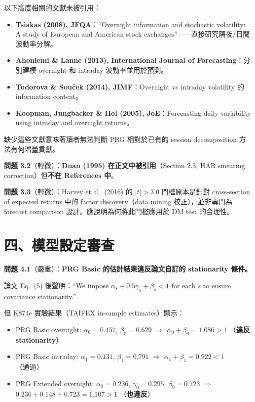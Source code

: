 \documentclass[12pt,a4paper]{article}
\begin{document}
以下高度相關的文獻未被引用：
\begin{itemize}
    \item \textbf{Tsiakas (2008), JFQA}：``Overnight information and stochastic volatility: A study of European and American stock exchanges''——直接研究隔夜/日間波動率分解。
    \item \textbf{Ahoniemi \& Lanne (2013), International Journal of Forecasting}：分別建模 overnight 和 intraday 波動率並用於預測。
    \item \textbf{Todorova \& Souček (2014), JIMF}：Overnight vs intraday volatility 的 information content。
    \item \textbf{Koopman, Jungbacker \& Hol (2005), JoE}：Forecasting daily variability using intraday and overnight returns。
\end{itemize}

缺少這些文獻意味著讀者無法判斷 PRG 相對於已有的 session decomposition 方法有何增量貢獻。

\textbf{問題 3.2}（輕微）：\textbf{Duan (1995) 在正文中被引用}（Section 2.3, HAR smearing correction）但\textbf{不在 References 中}。

\textbf{問題 3.3}（輕微）：Harvey et al.\ (2016) 的 $|t| > 3.0$ 門檻原本是針對 cross-section of expected returns 中的 factor discovery（data mining 校正），並非專門為 forecast comparison 設計。應說明為何將此門檻應用於 DM test 的合理性。


\section{四、模型設定審查}

\textbf{問題 4.1}（\textcolor{errorred}{嚴重}）：\textbf{PRG Basic 的估計結果違反論文自訂的 stationarity 條件。}

論文 Eq.\ (5) 後聲明：``We impose $\alpha_s + 0.5\gamma_s + \beta_s < 1$ for each $s$ to ensure covariance stationarity.''

但 K874c 實驗結果（TAIFEX in-sample estimates）顯示：
\begin{itemize}
    \item PRG Basic overnight: $\alpha_0 = 0.457$, $\beta_0 = 0.629$ $\Rightarrow$ $\alpha_0 + \beta_0 = 1.086 > 1$ \textcolor{errorred}{（\textbf{違反 stationarity}）}
    \item PRG Basic intraday: $\alpha_1 = 0.131$, $\beta_1 = 0.791$ $\Rightarrow$ $\alpha_1 + \beta_1 = 0.922 < 1$ （通過）
    \item PRG Extended overnight: $\alpha_0 = 0.236$, $\gamma_0 = 0.295$, $\beta_0 = 0.723$ $\Rightarrow$ $0.236 + 0.148 + 0.723 = 1.107 > 1$ \textcolor{errorred}{（\textbf{也違反}）}
\end{itemize}
\end{document}
